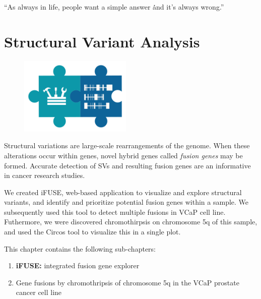 \cleartorightpage
\begin{savequote}[75mm]
“As always in life, people want a simple answer \. \. \. and it’s always wrong.”
\end{savequote}

\chapter{Structural Variant Analysis}\label{chapter:fusiongenes}
\setcounter{figure}{-1}
\setcounter{table}{-1}
\setcounter{section}{-1}

\begin{figure}[t!]
\includegraphics[height=10em]{frontmatter/images/chapter-header-fusion-tools.png}
\end{figure}
\setcounter{figure}{-1}
\setcounter{table}{-1}
\setcounter{section}{-1}


Structural variations are large-scale rearrangements of the genome. When these alterations occur within genes, novel hybrid genes called \emph{fusion genes} may be formed. Accurate detection of SVs and resulting fusion genes are an informative in cancer research studies.

We created iFUSE, web-based application to visualize and explore structural variants, and identify and prioritize potential fusion genes within a sample. We subsequently used this tool to detect multiple fusions in VCaP cell line. Futhermore, we were discovered chromothirpsis on chromosome 5q of this sample, and used the Circos tool to visualize this in a single plot.

This chapter contains the following sub-chapters:

\begin{enumerate}[label=\ref{chapter:fusiongenes}.\arabic*]
\itemsep-0.5em
\setcounter{enumi}{-1}
\item \textbf{iFUSE:} integrated fusion gene explorer
\item Gene fusions by chromothripsis of chromosome 5q in the VCaP prostate cancer cell line
\end{enumerate}

